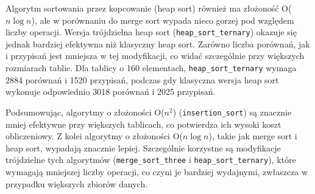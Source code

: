 \documentclass{article}
\theoremstyle{definition}
\begin{document}
Algorytm sortowania przez kopcowanie (heap sort) również ma złożoność O($n \log n$), ale w porównaniu do merge sort wypada nieco gorzej pod względem liczby operacji. Wersja trójdzielna heap sort (\texttt{heap\_sort\_ternary}) okazuje się jednak bardziej efektywna niż klasyczny heap sort. Zarówno liczba porównań, jak i przypisań jest mniejsza w tej modyfikacji, co widać szczególnie przy większych rozmiarach tablic. Dla tablicy o 160 elementach, \texttt{heap\_sort\_ternary} wymaga 2884 porównań i 1520 przypisań, podczas gdy klasyczna wersja heap sort wykonuje odpowiednio 3018 porównań i 2025 przypisań.

Podsumowując, algorytmy o złożoności O($n^2$) (\texttt{insertion\_sort}) są znacznie mniej efektywne przy większych tablicach, co potwierdza ich wysoki koszt obliczeniowy. Z kolei algorytmy o złożoności O($n \log n$), takie jak merge sort i heap sort, wypadają znacznie lepiej. Szczególnie korzystne są modyfikacje trójdzielne tych algorytmów (\texttt{merge\_sort\_three} i \texttt{heap\_sort\_ternary}), które wymagają mniejszej liczby operacji, co czyni je bardziej wydajnymi, zwłaszcza w przypadku większych zbiorów danych.
\end{document}
